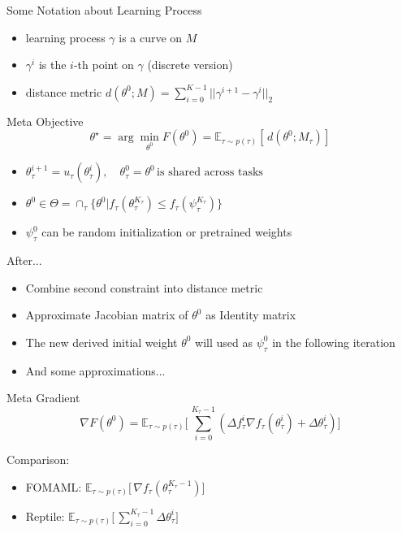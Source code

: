 \documentclass{beamer}
\begin{document}
\begin{frame}{Some Notation about Learning Process}
  \begin{itemize}
    \item learning process $\gamma$ is a curve on $M$
    \item $\gamma^i$ is the $i$-th point on $\gamma$ (discrete version)
    \item distance metric $d(\theta^0;M) = \sum_{i=0}^{K-1} ||\gamma^{i+1} - \gamma^i||_2$
  \end{itemize}
\end{frame}

\begin{frame}
  \begin{block}{Meta Objective}
  \[
    \theta^{\star} = \arg\min_{\theta^0} F(\theta^0) = \mathbb{E}_{\tau \sim p(\tau)} [\, d(\theta^0;M_\tau) ]\,
  \]
  \end{block}

  \begin{itemize}
    \item $\theta_{\tau}^{i+1} = u_\tau(\theta^i_\tau), \quad \theta_\tau^0 = \theta^0 \, \text{is shared across tasks}$
    \item $\theta^0 \in \Theta = \cap_\tau \lbrace \theta^0 | f_\tau(\theta_\tau^{K_\tau}) \leq f_\tau(\psi_\tau^{K_\tau}) \rbrace$
    \item $\psi_\tau^0$ can be random initialization or pretrained weights
  \end{itemize}
\end{frame}

\begin{frame}{After...}
  \begin{itemize}
    \item Combine second constraint into distance metric
    \item Approximate Jacobian matrix of $\theta^0$ as Identity matrix
    \item The new derived initial weight $\theta^0$ will used as $\psi_\tau^0$ in the following iteration
    \item And some approximations...
  \end{itemize}
\end{frame}

\begin{frame}{Meta Gradient}
  \[
    \nabla F(\theta^0) = \mathbb{E}_{\tau \sim p(\tau)} \Big [\, \sum_{i=0}^{K_\tau - 1} (\Delta f_\tau^i \nabla f_\tau(\theta_\tau^i) + \Delta \theta_\tau^i ) \Big]\,
  \]

  Comparison:
  \begin{itemize}
    \item FOMAML: $\mathbb{E}_{\tau \sim p(\tau)} \Big [\, \nabla f_\tau(\theta^{K_\tau -1}_\tau) \Big ]\,$ 
    \item Reptile: $\mathbb{E}_{\tau \sim p(\tau)} \Big [\, \sum_{i=0}^{K_\tau - 1} \Delta \theta_\tau^i \Big ]\,$
  \end{itemize}
\end{frame}
\end{document}
